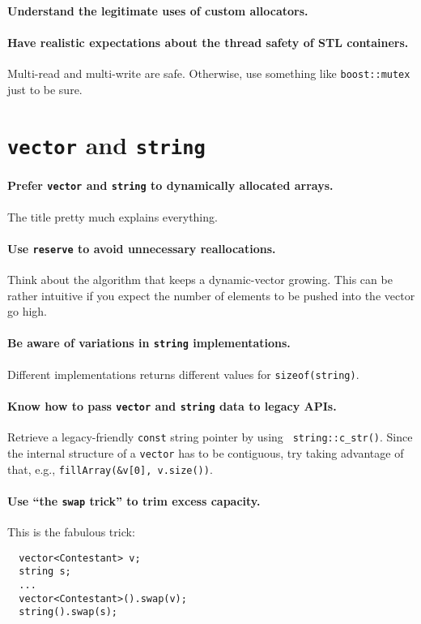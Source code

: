 \documentclass{article}
\begin{document}
\paragraph{Understand the legitimate uses of custom allocators.}

\paragraph{Have realistic expectations about the thread safety of STL
containers.}  Multi-read and multi-write are safe.  Otherwise, use something
like {\tt boost::mutex} just to be sure.

\section{{\tt vector} and {\tt string}}

\paragraph{Prefer {\tt vector} and {\tt string} to dynamically allocated
arrays.} The title pretty much explains everything.

\paragraph{Use {\tt reserve} to avoid unnecessary reallocations.}  Think about
the algorithm that keeps a dynamic-vector growing.  This can be rather
intuitive if you expect the number of elements to be pushed into the vector go
high.

\paragraph{Be aware of variations in {\tt string} implementations.}
Different implementations returns different values for {\tt sizeof(string)}. 

\paragraph{Know how to pass {\tt vector} and {\tt string} data to legacy APIs.}
Retrieve a legacy-friendly {\tt const} string pointer by using {\tt
string::c\_str()}.  Since the internal structure of a {\tt vector} has to be
contiguous, try taking advantage of that, e.g., {\tt fillArray(\&v[0],
v.size())}.

\paragraph{Use ``the {\tt swap} trick'' to trim excess capacity.}
This is the fabulous trick:
\begin{verbatim}
  vector<Contestant> v;
  string s;
  ...
  vector<Contestant>().swap(v);
  string().swap(s);
\end{verbatim}
\end{document}
